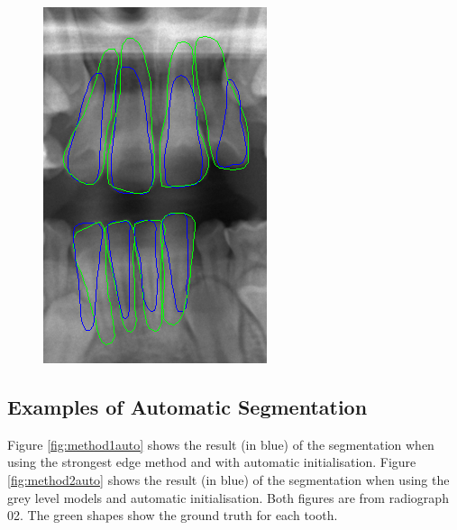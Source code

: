 \documentclass[11pt]{article}
\begin{document}
\begin{figure}[H]
\begin{minipage}{.4\textwidth}
  \includegraphics[width=\linewidth]{03_method2_manual}
  \label{fig:method2man}
\end{minipage}
\end{figure}

\subsection{Examples of Automatic Segmentation}

Figure \ref{fig:method1auto} shows the result (in blue) of the segmentation when using the strongest edge method and with automatic initialisation. Figure \ref{fig:method2auto} shows the result (in blue) of the segmentation when using the grey level models and automatic initialisation. Both figures are from radiograph 02. The green shapes show the ground truth for each tooth.
\end{document}

